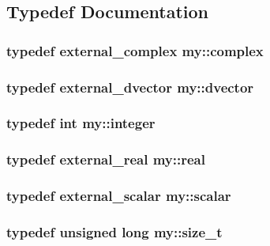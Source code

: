 \subsection{Typedef Documentation}
\hypertarget{namespacemy_a1ed6ea9ef51c0aa31f8b671fb04d758f}{
\subsubsection[{complex}]{\setlength{\rightskip}{0pt plus 5cm}typedef {\bf external\+\_\+complex} {\bf my\+::complex}}}\label{namespacemy_a1ed6ea9ef51c0aa31f8b671fb04d758f}
\hypertarget{namespacemy_afcfd7741f90501dab9d33b06ec3614d4}{
\subsubsection[{dvector}]{\setlength{\rightskip}{0pt plus 5cm}typedef {\bf external\+\_\+dvector} {\bf my\+::dvector}}}\label{namespacemy_afcfd7741f90501dab9d33b06ec3614d4}
\hypertarget{namespacemy_a42365393c537edae1e89d20ff90d1923}{
\subsubsection[{integer}]{\setlength{\rightskip}{0pt plus 5cm}typedef int {\bf my\+::integer}}}\label{namespacemy_a42365393c537edae1e89d20ff90d1923}
\hypertarget{namespacemy_ad61baeaeda728a4c48dd64f93e44a46c}{
\subsubsection[{real}]{\setlength{\rightskip}{0pt plus 5cm}typedef {\bf external\+\_\+real} {\bf my\+::real}}}\label{namespacemy_ad61baeaeda728a4c48dd64f93e44a46c}
\hypertarget{namespacemy_a12d9dde7e2fb58fbd11051705c382a86}{
\subsubsection[{scalar}]{\setlength{\rightskip}{0pt plus 5cm}typedef {\bf external\+\_\+scalar} {\bf my\+::scalar}}}\label{namespacemy_a12d9dde7e2fb58fbd11051705c382a86}
\hypertarget{namespacemy_ac9e2c9fc46dc44ed285976e482ee6ef4}{
\subsubsection[{size\+\_\+t}]{\setlength{\rightskip}{0pt plus 5cm}typedef unsigned long {\bf my\+::size\+\_\+t}}}\label{namespacemy_ac9e2c9fc46dc44ed285976e482ee6ef4}
